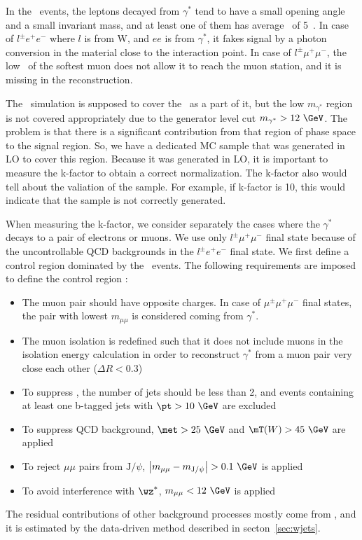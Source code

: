 In the \wgammastar\ events, the leptons decayed from $\gamma^*$ tend to have 
a small opening angle and a small invariant mass, and at least one of them 
has average \pt\ of 5~\GeV. 
In case of $l^\pm e^+ e^-$ where $l$ is from W, and $ee$ is from $\gamma^*$, 
it fakes signal by a 
photon conversion in the material close to the interaction point.
In case of $l^\pm\mu^+\mu^-$, the low \pt\ of the softest muon does not allow 
it to reach the muon station, and it is missing in the reconstruction. 

The \wz\ simulation is supposed to cover the \wgammastar\ as a part of it, 
but the low $m_{\gamma^*}$ region is not covered appropriately due to the generator 
level cut $m_{\gamma^*}>12~\GeV$. The problem is that there is a significant 
contribution from that region of phase space to the signal region.
So, we have a dedicated MC sample that was generated in LO to cover this region.
Because it was generated in LO, it is important to measure the k-factor 
to obtain a correct normalization. The k-factor also would tell about the 
valiation of the sample. For example, if k-factor is 10, this would indicate 
that the sample is not correctly generated.

When measuring the k-factor, we consider separately 
the cases where the $\gamma^*$ decays to a pair of electrons or muons. 
We use only $l^\pm\mu^+\mu^-$ final state 
because of the uncontrollable QCD backgrounds in the $l^\pm e^+ e^-$ final state. 
We first define a control region dominated by the \wgammastar\ events. 
The following requirements are imposed to define the control region :  
\begin{itemize} 
\item The muon pair should have opposite charges. In case of $\mu^\pm\mu^+\mu^-$ final states, 
      the pair with lowest $m_{\mu\mu}$ is considered coming from $\gamma^*$.
\item The muon isolation is redefined such that it does not include muons in the isolation 
      energy calculation in order to reconstruct $\gamma^*$ from a muon pair very close each other 
      ($\Delta R < 0.3$)
\item To suppress \topbkg, the number of jets should be less than 2, and events containing at least 
      one b-tagged jets with $\pt>10~\GeV$ are excluded
\item To suppress QCD background, $\met>25~\GeV$ and $\mT(W)>45~\GeV$ are applied 
\item To reject $\mu\mu$ pairs from $\textrm{J}/\psi$, 
      $\left| m_{\mu\mu} - m_{\textrm{J}/\psi}\right| > 0.1~\GeV$ is applied
\item To avoid interference with $\wz^*$, $m_{\mu\mu} < 12~\GeV$ is applied
\end{itemize} 
The residual contributions of other background processes mostly come from \Wjets, 
and it is estimated by the data-driven method described in secton~\ref{sec:wjets}.

